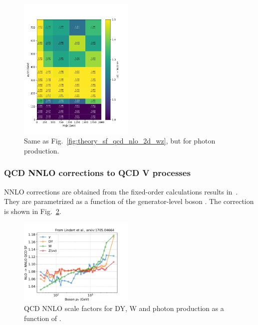 \begin{figure}[ht!]
    \begin{center}
        \includegraphics[width=0.49\textwidth]{fig/theory/2d_gjets_gen_vpt_vbf_stat1.pdf}
        \caption{
            Same as Fig.~\ref{fig:theory_sf_qcd_nlo_2d_wz}, but for photon production.
          }
      \label{fig:theory_sf_qcd_nlo_2d_gamma}
    \end{center}
  \end{figure}

\subsubsection{QCD NNLO corrections to QCD V processes}

NNLO corrections are obtained from the fixed-order calculations results in~\cite{DMTheory}. They are parametrized as a function of the generator-level boson \pt. The correction is shown in Fig.~\ref{fig:theory_sf_qcd_nnlo}.

\begin{figure}[ht!]
    \begin{center}
        \includegraphics[width=0.49\textwidth]{fig/theory/nnlo_qcd.pdf}
        \caption{
            QCD NNLO scale factors for DY, W and photon production as a function of \ptv.
          }
      \label{fig:theory_sf_qcd_nnlo}
    \end{center}
  \end{figure}

